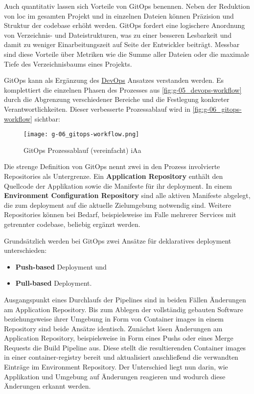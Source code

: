 Auch quantitativ lassen sich Vorteile von GitOps benennen. Neben der Reduktion von \Gls{loc} im gesamten Projekt und in einzelnen Dateien können Präzision und Struktur der \Gls{codebase} erhöht werden. GitOps fordert eine logischere Anordnung von Verzeichnis- und Dateistrukturen, was zu einer besseren Lesbarkeit und damit zu weniger Einarbeitungszeit auf Seite der Entwickler beiträgt. Messbar sind diese Vorteile über Metriken wie die Summe aller Dateien oder die maximale Tiefe des Verzeichnisbaums eines Projekts. \cite{008:GitOps-Approach-to-Cloud-Cluster-System-Deployment}

GitOps kann als Ergänzung des \hyperref[sec:03-01_introduction-to-devops]{DevOps} Ansatzes verstanden werden. Es komplettiert die einzelnen Phasen des Prozesses aus \autoref{fig:g-05_devops-workflow} durch die Abgrenzung verschiedener Bereiche und die Festlegung konkreter Verantwortlichkeiten. Dieser verbesserte Prozessablauf wird in \autoref{fig:g-06_gitops-workflow} sichtbar:

\begin{figure}[h]
    \centering
    \texttt{[image: g-06\_gitops-workflow.png]}
    \caption{GitOps Prozessablauf (vereinfacht) \acrshort{iAa} \citeauthor{008:GitOps-Approach-to-Cloud-Cluster-System-Deployment}}
    \label{fig:g-06_gitops-workflow}
\end{figure}

Die strenge Definition von GitOps nennt zwei in den Prozess involvierte Repositories als Untergrenze. Ein \textbf{Application Repository} enthält den Quellcode der Applikation sowie die Manifeste für ihr \Gls{deployment}. In einem \textbf{Environment Configuration Repository} sind alle aktiven Manifeste abgelegt, die zum \Gls{deployment} auf die aktuelle Zielumgebung notwendig sind. Weitere Repositories können bei Bedarf, beispielsweise im Falle mehrerer Services mit getrennter \Gls{codebase}, beliebig ergänzt werden. \cite{109:GitOps}

Grundsätzlich werden bei GitOps zwei Ansätze für deklaratives \Gls{deployment} unterschieden:

\begin{itemize}
    \item \textbf{Push-based} Deployment und
    \item \textbf{Pull-based} Deployment.
\end{itemize}

Ausgangspunkt eines Durchlaufs der Pipelines sind in beiden Fällen Änderungen am Application Repository. Bis zum Ablegen der vollständig gebauten Software beziehungsweise ihrer Umgebung in Form von Container \Glspl{image} in einem Repository sind beide Ansätze identisch. Zunächst lösen Änderungen am Application Repository, beispielsweise in Form eines Pushs oder eines Merge Requests die Build Pipeline aus. Diese stellt die resultierenden Container \Glspl{image} in einer \Gls{container-registry} bereit und aktualisiert anschließend die verwandten Einträge im Environment Repository. \cite{007:Analysis-of-Declarative-and-Pull-based-Deployment-Models-on-GitOps} Der Unterschied liegt nun darin, wie Applikation und Umgebung auf Änderungen reagieren und wodurch diese Änderungen erkannt werden.

